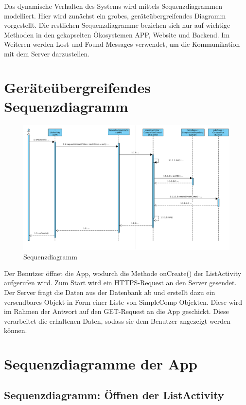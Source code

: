 	Das dynamische Verhalten des Systems wird mittels Sequenzdiagrammen modelliert.
	Hier wird zunächst ein grobes, geräteübergreifendes Diagramm vorgestellt.
	Die restlichen Sequenzdiagramme beziehen sich nur auf wichtige Methoden in den gekapselten Ökosystemen APP, Website und Backend. Im Weiteren werden Lost und Found Messages verwendet, um die Kommunikation mit dem Server darzustellen. 
	
\section*{Geräteübergreifendes Sequenzdiagramm}

\begin{figure}[h]
	\centering
	\includegraphics[width=\textwidth]{img/Diagramme/Sequenz/Overview}
	\caption{Sequenzdiagramm}
	\label{fig:sequenz-overview}
\end{figure}
\noindent
Der Benutzer öffnet die App, wodurch die Methode onCreate() der ListActivity aufgerufen wird. Zum Start wird ein HTTPS-Request an den Server gesendet. Der Server fragt die Daten aus der Datenbank ab und erstellt dazu ein versendbares Objekt in Form einer Liste von SimpleComp-Objekten. Diese wird im Rahmen der Antwort auf den GET-Request an die App geschickt. Diese verarbeitet die erhaltenen Daten, sodass sie dem Benutzer angezeigt werden können.

\section*{Sequenzdiagramme der App}
\subsection*{Sequenzdiagramm: Öffnen der ListActivity}

